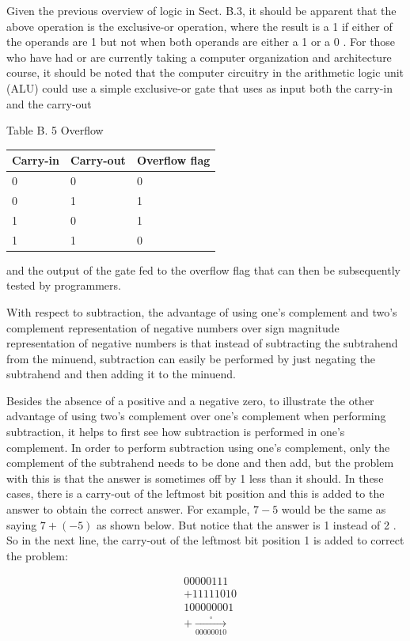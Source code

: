 \documentclass[10pt]{article}
\begin{document}
Given the previous overview of logic in Sect. B.3, it should be apparent that the above operation is the exclusive-or operation, where the result is a 1 if either of the operands are 1 but not when both operands are either a 1 or a 0 . For those who have had or are currently taking a computer organization and architecture course, it should be noted that the computer circuitry in the arithmetic logic unit (ALU) could use a simple exclusive-or gate that uses as input both the carry-in and the carry-out

Table B. 5 Overflow

\begin{center}
\begin{tabular}{|l|l|l|}
\hline
Carry-in & Carry-out & Overflow flag \\
\hline
0 & 0 & 0 \\
\hline
0 & 1 & 1 \\
\hline
1 & 0 & 1 \\
\hline
1 & 1 & 0 \\
\hline
\end{tabular}
\end{center}

and the output of the gate fed to the overflow flag that can then be subsequently tested by programmers.

With respect to subtraction, the advantage of using one's complement and two's complement representation of negative numbers over sign magnitude representation of negative numbers is that instead of subtracting the subtrahend from the minuend, subtraction can easily be performed by just negating the subtrahend and then adding it to the minuend.

Besides the absence of a positive and a negative zero, to illustrate the other advantage of using two's complement over one's complement when performing subtraction, it helps to first see how subtraction is performed in one's complement. In order to perform subtraction using one's complement, only the complement of the subtrahend needs to be done and then add, but the problem with this is that the answer is sometimes off by 1 less than it should. In these cases, there is a carry-out of the leftmost bit position and this is added to the answer to obtain the correct answer. For example, $7-5$ would be the same as saying $7+(-5)$ as shown below. But notice that the answer is 1 instead of 2 . So in the next line, the carry-out of the leftmost bit position 1 is added to correct the problem:

$$
\begin{aligned}
& 00000111 \\
& +11111010 \\
& 100000001 \\
& +\xrightarrow[00000010]{\square}
\end{aligned}
$$
\end{document}
